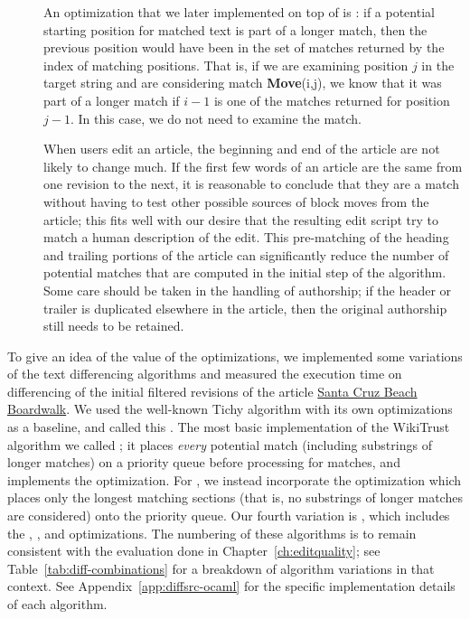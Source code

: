 \begin{description}
\item[]
    An optimization that we later implemented on top of
     is :
    if a potential starting position for matched text is part of
    a longer match, then the previous position would have
    been in the set of matches returned by the index of
    matching positions.
    That is, if we are examining position $j$ in the target string
    and are considering match \textbf{Move}(i,j), we know that it
    was part of a longer match if $i-1$ is one of the matches returned
    for position $j-1$.
    In this case, we do not need to examine the match.

\item[] When users edit an article, the beginning
    and end of the article are not likely to change much.
    If the first few words of an article are the same from one revision to
    the next, it is reasonable to conclude that they are a match
    without having to test other possible sources of block moves
    from the article; this fits well with our desire that the resulting
    edit script try to match a human description of the edit.
    This pre-matching of the heading and trailing portions of the
    article can significantly reduce the number of potential matches
    that are computed in the initial step of the algorithm.
    Some care should be taken in the handling of authorship;
    if the header or trailer is duplicated elsewhere in the article,
    then the original authorship still needs to be retained.

\end{description}


To give an idea of the value of the optimizations, we implemented some
variations of the text differencing algorithms and measured the
execution time on differencing of the initial filtered revisions of the
article \underline{Santa Cruz Beach Boardwalk}.
We used the well-known Tichy algorithm with its own
optimizations~\cite{Tichy1984,Obst1987,Reichenberger1991}
as a baseline, and called this .
The most basic implementation of the WikiTrust algorithm we called
; it places \textit{every} potential match (including substrings
of longer matches) on a priority queue
before processing for matches, and implements the 
optimization.
For , we instead incorporate the  optimization which
places only the longest matching sections (that is, no substrings of
longer matches are considered) onto the priority queue.
Our fourth variation is , which includes the ,
, and  optimizations.
The numbering of these algorithms is to remain consistent with the
evaluation done in Chapter~\ref{ch:editquality}; see
Table~\ref{tab:diff-combinations} for a breakdown of algorithm
variations in that context.
See Appendix~\ref{app:diffsrc-ocaml} for the specific implementation details
of each algorithm.

